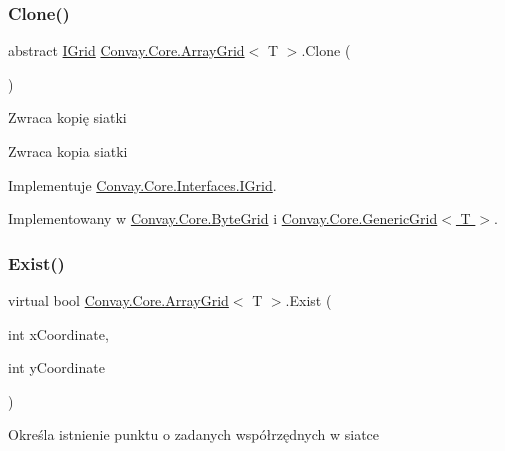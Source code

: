 \subsubsection{\texorpdfstring{Clone()}{Clone()}}
{\footnotesize\ttfamily abstract \hyperlink{interface_convay_1_1_core_1_1_interfaces_1_1_i_grid}{I\+Grid} \hyperlink{class_convay_1_1_core_1_1_array_grid}{Convay.\+Core.\+Array\+Grid}$<$ T $>$.Clone (\begin{DoxyParamCaption}{ }\end{DoxyParamCaption})\hspace{0.3cm}{\ttfamily [pure virtual]}}



Zwraca kopię siatki 

\begin{DoxyReturn}{Zwraca}
kopia siatki
\end{DoxyReturn}


Implementuje \hyperlink{interface_convay_1_1_core_1_1_interfaces_1_1_i_grid_afb85615bea4fe14885fc2c36b16a9309}{Convay.\+Core.\+Interfaces.\+I\+Grid}.



Implementowany w \hyperlink{class_convay_1_1_core_1_1_byte_grid_aff3101705112bb6f708d694b34a7e5f2}{Convay.\+Core.\+Byte\+Grid} i \hyperlink{class_convay_1_1_core_1_1_generic_grid_af2556688d2c1a33797ce8f79d15836b4}{Convay.\+Core.\+Generic\+Grid$<$ T $>$}.

\hypertarget{class_convay_1_1_core_1_1_array_grid_a90fc10f845bf94f334079751fc9c1cba}{}\label{class_convay_1_1_core_1_1_array_grid_a90fc10f845bf94f334079751fc9c1cba} 
\subsubsection{\texorpdfstring{Exist()}{Exist()}}
{\footnotesize\ttfamily virtual bool \hyperlink{class_convay_1_1_core_1_1_array_grid}{Convay.\+Core.\+Array\+Grid}$<$ T $>$.Exist (\begin{DoxyParamCaption}\item[{int}]{x\+Coordinate,  }\item[{int}]{y\+Coordinate }\end{DoxyParamCaption})\hspace{0.3cm}{\ttfamily [virtual]}}



Określa istnienie punktu o zadanych współrzędnych w siatce 


